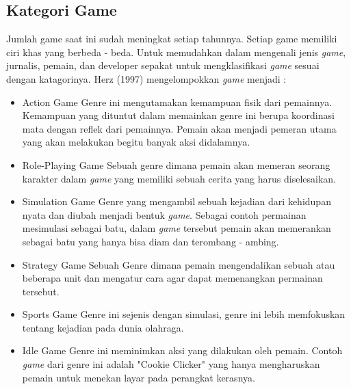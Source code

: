 	\subsection{Kategori Game}
	Jumlah game saat ini sudah meningkat setiap tahunnya. Setiap game memiliki ciri khas yang berbeda - beda. Untuk memudahkan dalam mengenali jenis \textit{game}, jurnalis, pemain, dan developer sepakat untuk mengklasifikasi \textit{game} sesuai dengan katagorinya. Herz (1997) mengelompokkan \textit{game} menjadi :
	\begin{itemize}
		\item Action Game
			\subitem Genre ini mengutamakan kemampuan fisik dari pemainnya. Kemampuan yang dituntut dalam memainkan genre ini berupa koordinasi mata dengan reflek dari pemainnya. Pemain akan menjadi pemeran utama yang akan melakukan begitu banyak aksi didalamnya.
		\item Role-Playing Game
			\subitem Sebuah genre dimana pemain akan memeran seorang karakter dalam \textit{game} yang memiliki sebuah cerita yang harus diselesaikan.
		\item Simulation Game
			\subitem Genre yang mengambil sebuah kejadian dari kehidupan nyata dan diubah menjadi bentuk \textit{game}. Sebagai contoh permainan mesimulasi sebagai batu, dalam \textit{game} tersebut pemain akan memerankan sebagai batu yang hanya bisa diam dan terombang - ambing.
		\item Strategy Game
			\subitem Sebuah Genre dimana pemain mengendalikan sebuah atau beberapa unit dan mengatur cara agar dapat memenangkan permainan tersebut.
		\item Sports Game
			\subitem Genre ini sejenis dengan simulasi, genre ini lebih memfokuskan tentang kejadian pada dunia olahraga.
		\item Idle Game
			\subitem Genre ini meminimkan aksi yang dilakukan oleh pemain. Contoh \textit{game} dari genre ini adalah "Cookie Clicker" yang hanya mengharuskan pemain untuk menekan layar pada perangkat kerasnya.
	\end{itemize}
	
